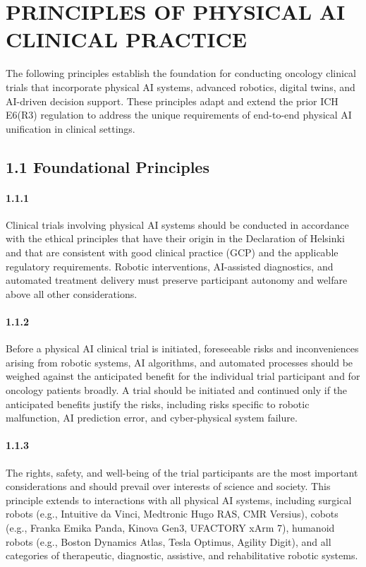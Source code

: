 \documentclass[11pt]{article}
\begin{document}
\section{PRINCIPLES OF PHYSICAL AI CLINICAL PRACTICE}

The following principles establish the foundation for conducting oncology clinical trials that incorporate physical AI systems, advanced robotics, digital twins, and AI-driven decision support. These principles adapt and extend the prior ICH E6(R3) regulation to address the unique requirements of end-to-end physical AI unification in clinical settings.

\subsection{1.1 Foundational Principles}

\paragraph{1.1.1} Clinical trials involving physical AI systems should be conducted in accordance with the ethical principles that have their origin in the Declaration of Helsinki and that are consistent with good clinical practice (GCP) and the applicable regulatory requirements. Robotic interventions, AI-assisted diagnostics, and automated treatment delivery must preserve participant autonomy and welfare above all other considerations.

\paragraph{1.1.2} Before a physical AI clinical trial is initiated, foreseeable risks and inconveniences arising from robotic systems, AI algorithms, and automated processes should be weighed against the anticipated benefit for the individual trial participant and for oncology patients broadly. A trial should be initiated and continued only if the anticipated benefits justify the risks, including risks specific to robotic malfunction, AI prediction error, and cyber-physical system failure.

\paragraph{1.1.3} The rights, safety, and well-being of the trial participants are the most important considerations and should prevail over interests of science and society. This principle extends to interactions with all physical AI systems, including surgical robots (e.g., Intuitive da Vinci, Medtronic Hugo RAS, CMR Versius), cobots (e.g., Franka Emika Panda, Kinova Gen3, UFACTORY xArm 7), humanoid robots (e.g., Boston Dynamics Atlas, Tesla Optimus, Agility Digit), and all categories of therapeutic, diagnostic, assistive, and rehabilitative robotic systems.
\end{document}
